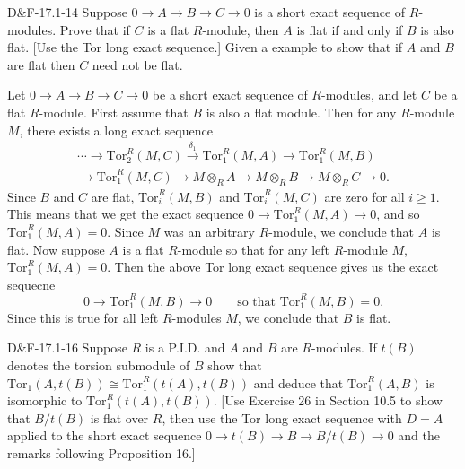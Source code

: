 \documentclass{article}
\newcommand{\tor}{\text{Tor}}
\begin{document}
	\begin{prb}{D\&F-17.1-14}
		Suppose $0 \to A \to B \to C \to 0$ is a short exact sequence of $R$-modules. Prove that if $C$ is a flat $R$-module, then $A$ is flat if and only if $B$ is also flat. [Use the Tor long exact sequence.] Given a example to show that if $A$ and $B$ are flat then $C$ need not be flat. 
	\end{prb}
	
	Let $0 \to A\to B \to C \to 0$ be a short exact sequence of $R$-modules, and let $C$ be a flat $R$-module. First assume that $B$ is also a flat module. Then for any $R$-module $M$, there exists a long exact sequence 
	\begin{multline*}
		\dotsm \to \tor_{2}^{R}(M, C) \xrightarrow{\delta_{1}} \tor_{1}^{R}(M, A) \to \tor_{1}^{R}(M, B) \\ \to \tor_{1}^{R}(M, C) \to M \otimes_{R} A \to M \otimes_{R} B \to M \otimes_{R} C \to 0.
	\end{multline*}
	Since $B$ and $C$ are flat, $\tor_{i}^{R}(M, B)$ and $\tor_{i}^{R}(M, C)$ are zero for all $i \geq 1$. This means that we get the exact sequence $0 \to \tor_{1}^{R}(M, A) \to 0$, and so $\tor_{1}^{R}(M, A) = 0$. Since $M$ was an arbitrary $R$-module, we conclude that $A$ is flat. Now suppose $A$ is a flat $R$-module so that for any left $R$-module $M$, $\tor_{1}^{R}(M, A) = 0$. Then the above Tor long exact sequence gives us the exact sequecne 
	\begin{equation*}
		0 \to \tor_{1}^{R}(M, B) \to 0 \qquad \text{so that $\tor_{1}^{R}(M, B) = 0$.}
	\end{equation*}
	Since this is true for all left $R$-modules $M$, we conclude that $B$ is flat. 
	
	\begin{prb}{D\&F-17.1-16}
		Suppose $R$ is a P.I.D. and $A$ and $B$ are $R$-modules. If $t(B)$ denotes the torsion submodule of $B$ show that $\tor_{1}(A,t(B)) \cong \tor_{1}^{R}(t(A),t(B))$ and deduce that $\tor_{1}^{R}(A,B)$ is isomorphic to $\tor_{1}^{R}(t(A),t(B))$. [Use Exercise 26 in Section 10.5 to show that $B/t(B)$ is flat over $R$, then use the Tor long exact sequence with $D = A$ applied to the short exact sequence $0 \to t(B) \to B \to B/t(B) \to 0$ and the remarks following Proposition 16.]
	\end{prb}
	
\end{document}
